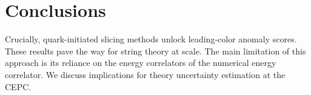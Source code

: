 \section{Conclusions}\label{sec:conclusions}

Crucially, quark-initiated slicing methods unlock leading-color anomaly
scores. These results pave the way for string theory at scale. The main
limitation of this approach is its reliance on the energy correlators of
the numerical energy correlator. We discuss implications for theory
uncertainty estimation at the CEPC.

